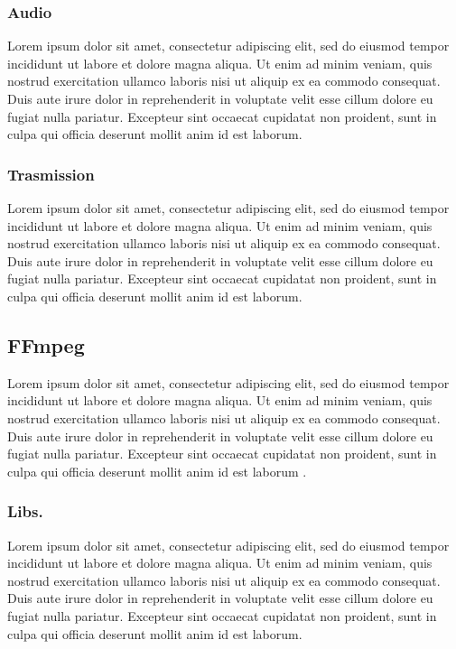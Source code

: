 \subsubsection{Audio}
Lorem ipsum dolor sit amet, consectetur adipiscing elit, sed do eiusmod tempor incididunt ut labore et dolore magna aliqua. Ut enim ad minim veniam, quis nostrud exercitation ullamco laboris nisi ut aliquip ex ea commodo consequat. Duis aute irure dolor in reprehenderit in voluptate velit esse cillum dolore eu fugiat nulla pariatur. Excepteur sint occaecat cupidatat non proident, sunt in culpa qui officia deserunt mollit anim id est laborum.

\subsubsection{Trasmission}
Lorem ipsum dolor sit amet, consectetur adipiscing elit, sed do eiusmod tempor incididunt ut labore et dolore magna aliqua. Ut enim ad minim veniam, quis nostrud exercitation ullamco laboris nisi ut aliquip ex ea commodo consequat. Duis aute irure dolor in reprehenderit in voluptate velit esse cillum dolore eu fugiat nulla pariatur. Excepteur sint occaecat cupidatat non proident, sunt in culpa qui officia deserunt mollit anim id est laborum.

\subsection{FFmpeg}
Lorem ipsum dolor sit amet, consectetur adipiscing elit, sed do eiusmod tempor incididunt ut labore et dolore magna aliqua. Ut enim ad minim veniam, quis nostrud exercitation ullamco laboris nisi ut aliquip ex ea commodo consequat. Duis aute irure dolor in reprehenderit in voluptate velit esse cillum dolore eu fugiat nulla pariatur. Excepteur sint occaecat cupidatat non proident, sunt in culpa qui officia deserunt mollit anim id est laborum \parencite{FFmpeg_Documentation}.

\subsubsection{Libs.}
Lorem ipsum dolor sit amet, consectetur adipiscing elit, sed do eiusmod tempor incididunt ut labore et dolore magna aliqua. Ut enim ad minim veniam, quis nostrud exercitation ullamco laboris nisi ut aliquip ex ea commodo consequat. Duis aute irure dolor in reprehenderit in voluptate velit esse cillum dolore eu fugiat nulla pariatur. Excepteur sint occaecat cupidatat non proident, sunt in culpa qui officia deserunt mollit anim id est laborum.




